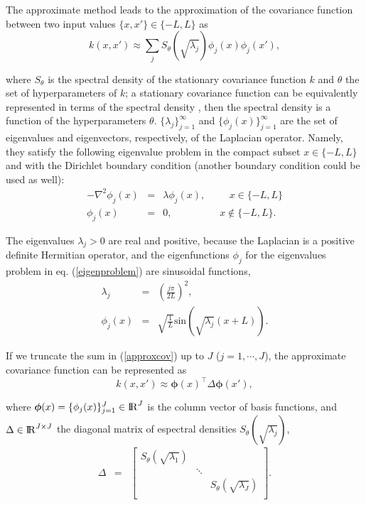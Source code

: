 \documentclass[]{interact}
\theoremstyle{plain}%
\theoremstyle{definition}
\theoremstyle{remark}
\begin{document}
\vspace{0.2cm}
The approximate method leads to the approximation of the covariance function between two input values $\{x,x'\} \in \{-L,L\}$ as 
%
\begin{equation}\label{approxcov}
k(x,x') \approx \sum_{j}S_{\theta}(\sqrt{\lambda_j}) \phi_j(x) \phi_j(x'),
\end{equation} 

\noindent where $S_{\theta}$ is the spectral density of the stationary covariance function $k$ and $\theta$ the set of hyperparameters of $k$; a stationary covariance function can be equivalently represented in terms of the spectral density \citep{rasmussen2006gaussian}, then the spectral density is a function of the hyperparameters $\theta$. $\{\lambda_j\}_{j=1}^{\infty}$ and $\{\phi_j(x)\}_{j=1}^{\infty}$ are the set of eigenvalues and eigenvectors, respectively, of the Laplacian operator. Namely, they satisfy the following eigenvalue problem in the compact subset $x \in \{-L,L\}$ and with the Dirichlet boundary condition (another boundary condition could be used as well):
%
\begin{eqnarray}\label{eigenproblem}
-\nabla^2 \phi_j(x)&=&\lambda \phi_j(x), \hspace{1cm}  x\in \{-L,L\} \nonumber \\ 
\phi_j(x)&=&0, \hspace{2cm} x\notin \{-L,L\}.
\end{eqnarray} 

\noindent The eigenvalues $\lambda_j>0$ are real and positive, because the Laplacian is a positive definite Hermitian operator, and the eigenfunctions $\phi_j$ for the eigenvalues problem in eq. (\ref{eigenproblem}) are sinusoidal functions,
%
\begin{eqnarray}
\lambda_j&=&\left(\frac{j\pi}{2L}\right)^2, \nonumber \\
\phi_j(x)&=&\sqrt{\frac{1}{L}} \text{sin}\left(\sqrt{\lambda_j}(x+L)\right). \nonumber
\end{eqnarray}

If we truncate the sum in (\ref{approxcov}) up to $J$ ($j=1,\cdots,J$), the approximate covariance function can be represented as
%
\begin{equation}
k(x,x') \approx \boldsymbol{\phi}(x)^\intercal \Delta \boldsymbol{\phi}(x'), \nonumber
\end{equation}

\noindent where $\boldsymbol{\phi}(x)=\{\phi_j(x)\}_{j=1}^{J} \in {\rm I\!R}^{J}$ is the column vector of basis functions, and $\Delta  \in {\rm I\!R}^{J\times J}$ the diagonal matrix of espectral densities $S_{\theta}(\sqrt{\lambda_j})$, 
%
\begin{eqnarray}
\Delta &=&  \begin{bmatrix}
    S_{\theta}(\sqrt{\lambda_1}) & & \\
    & \ddots & \nonumber \\
    & & S_{\theta}(\sqrt{\lambda_J}) \\
  \end{bmatrix}.
\end{eqnarray}
\end{document}
